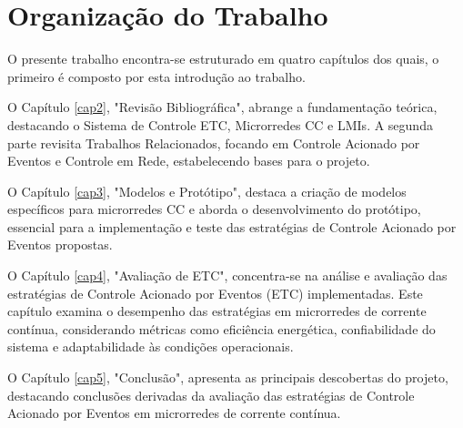 \section{Organização do Trabalho}

O presente trabalho encontra-se estruturado em quatro capítulos dos quais, o primeiro é composto por esta introdução ao trabalho.

O Capítulo \ref{cap2}, "Revisão Bibliográfica", abrange a fundamentação teórica, destacando o Sistema de Controle ETC, Microrredes CC e LMIs. A segunda parte revisita Trabalhos Relacionados, focando em Controle Acionado por Eventos e Controle em Rede, estabelecendo bases para o projeto.

O Capítulo \ref{cap3}, "Modelos e Protótipo", destaca a criação de modelos específicos para microrredes CC e aborda o desenvolvimento do protótipo, essencial para a implementação e teste das estratégias de Controle Acionado por Eventos propostas.

O Capítulo \ref{cap4}, "Avaliação de ETC", concentra-se na análise e avaliação das estratégias de Controle Acionado por Eventos (ETC)  implementadas. Este capítulo examina o desempenho das estratégias em microrredes de corrente contínua, considerando métricas como eficiência energética, confiabilidade do sistema e adaptabilidade às condições operacionais.

O Capítulo \ref{cap5}, "Conclusão", apresenta as principais descobertas do projeto, destacando conclusões derivadas da avaliação das estratégias de Controle Acionado por Eventos em microrredes de corrente contínua.

